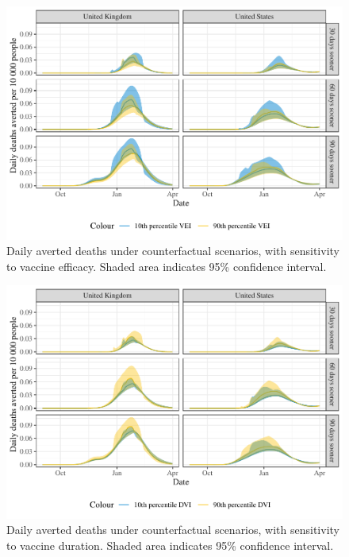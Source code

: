 \documentclass{article}
\begin{document}
\begin{figure}[H]

{\centering \includegraphics[height=0.35\textheight,]{_main_files/figure-latex/deaths-averted-plot-vei-1}

}

\caption{Daily averted deaths under counterfactual scenarios, with sensitivity to vaccine efficacy. Shaded area indicates 95\% confidence interval.}\label{fig:deaths-averted-plot-vei}
\end{figure}
\begin{figure}[H]

{\centering \includegraphics[height=0.35\textheight,]{_main_files/figure-latex/deaths-averted-plot-durV-1}

}

\caption{Daily averted deaths under counterfactual scenarios, with sensitivity to vaccine duration. Shaded area indicates 95\% confidence interval.}\label{fig:deaths-averted-plot-durV}
\end{figure}
\end{document}
